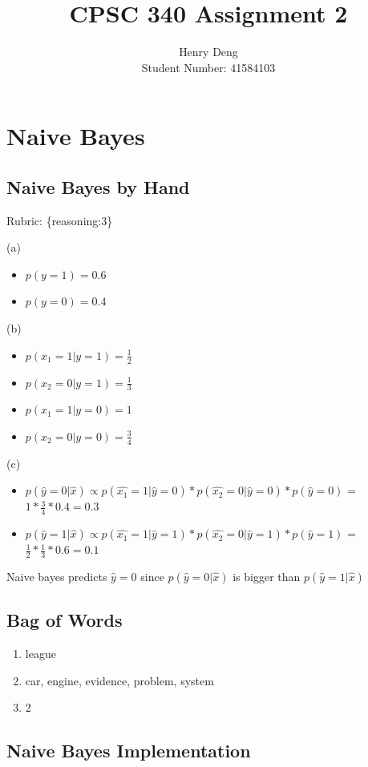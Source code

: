 \documentclass{article}
\def\blu#1{{\color{blu}#1}}
\def\gre#1{{\color{gre}#1}}
\def\items#1{\begin{itemize}#1\end{itemize}}
\def\enum#1{\begin{enumerate}#1\end{enumerate}}
\def\rubric#1{\gre{Rubric: \{#1\}}}{}
\begin{document}
\title{CPSC 340 Assignment 2}
\author{Henry Deng \\ Student Number: 41584103}
\date{}
\maketitle
\vspace{-4em}

\section{Naive Bayes}

\subsection{Naive Bayes by Hand}
\rubric{reasoning:3}

(a)
\items{
\item$ p(y = 1) = 0.6$
\item $p(y = 0) = 0.4$
}

(b)
\items{
\item $p(x_1 = 1 | y = 1) = \frac{1}{2}$
\item $p(x_2 = 0 | y = 1) = \frac{1}{3}$
\item $p(x_1 = 1 | y = 0) = 1$
\item $p(x_2 = 0 | y = 0) = \frac{3}{4}$
}

(c) 
\items{
\item $p(\hat{y} = 0|\hat{x}) \propto p(\hat{x_1} = 1|\hat{y} = 0) * p(\hat{x_2} = 0|\hat{y} = 0) * p(\hat{y} = 0)$ = $1 * \frac{3}{4} * 0.4 = 0.3$
\\
\item $p(\hat{y} = 1|\hat{x}) \propto p(\hat{x_1} = 1|\hat{y} = 1) * p(\hat{x_2} = 0|\hat{y} = 1) * p(\hat{y} = 1)$ = $\frac{1}{2} * \frac{1}{3} * 0.6 = 0.1$
}
\vspace{3mm}
\hspace{5mm} \blu{Naive bayes predicts $\hat{y} = 0$ since $p(\hat{y} = 0|\hat{x})$ is bigger than $p(\hat{y} = 1|\hat{x})$}


\subsection{Bag of Words}

\enum{
\item league 
\item car, engine, evidence, problem, system
\item 2
}

\subsection{Naive Bayes Implementation}
\end{document}
